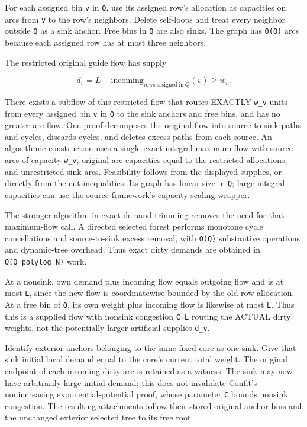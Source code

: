 For each assigned bin \texttt{v} in \texttt{Q}, use its assigned row's allocation as capacities on arcs from \texttt{v} to the row's neighbors. Delete self-loops and treat every neighbor outside \texttt{Q} as a sink anchor. Free bins in \texttt{Q} are also sinks. The graph has \texttt{O(\textbar{}Q\textbar{})} arcs because each assigned row has at most three neighbors.

The restricted original guide flow has supply

\[
d_v=L-\mathrm{incoming}_{\mathrm{rows\ assigned\ in}\ Q}(v)\ge w_v.
\]

There exists a subflow of this restricted flow that routes EXACTLY \texttt{w\_v} units from every assigned bin \texttt{v} in \texttt{Q} to the sink anchors and free bins, and has no greater arc flow. One proof decomposes the original flow into source-to-sink paths and cycles, discards cycles, and deletes excess paths from each source. An algorithmic construction uses a single exact integral maximum flow with source arcs of capacity \texttt{w\_v}, original arc capacities equal to the restricted allocations, and unrestricted sink arcs. Feasibility follows from the displayed supplies, or directly from the cut inequalities. Its graph has linear size in \texttt{Q}; large integral capacities can use the source framework's capacity-scaling wrapper.

The stronger algorithm in \href{https://github.com/icekylinx/algorithm-frontier/blob/main/manuscripts/graph-backends/exact-demand-flow-trimming.md}{exact demand trimming} removes the need for that maximum-flow call. A directed selected forest performs monotone cycle cancellations and source-to-sink excess removal, with \texttt{O(\textbar{}Q\textbar{})} substantive operations and dynamic-tree overhead. Thus exact dirty demands are obtained in \texttt{O(\textbar{}Q\textbar{}\ polylog\ N)} work.

At a nonsink, own demand plus incoming flow equals outgoing flow and is at most \texttt{L}, since the new flow is coordinatewise bounded by the old row allocation. At a free bin of \texttt{Q}, its own weight plus incoming flow is likewise at most \texttt{L}. Thus this is a supplied flow with nonsink congestion \texttt{C=L} routing the ACTUAL dirty weights, not the potentially larger artificial supplies \texttt{d\_v}.

Identify exterior anchors belonging to the same fixed core as one sink. Give that sink initial local demand equal to the core's current total weight. The original endpoint of each incoming dirty arc is retained as a witness. The sink may now have arbitrarily large initial demand; this does not invalidate Conflt's nonincreasing exponential-potential proof, whose parameter \texttt{C} bounds nonsink congestion. The resulting attachments follow their stored original anchor bins and the unchanged exterior selected tree to its free root.

